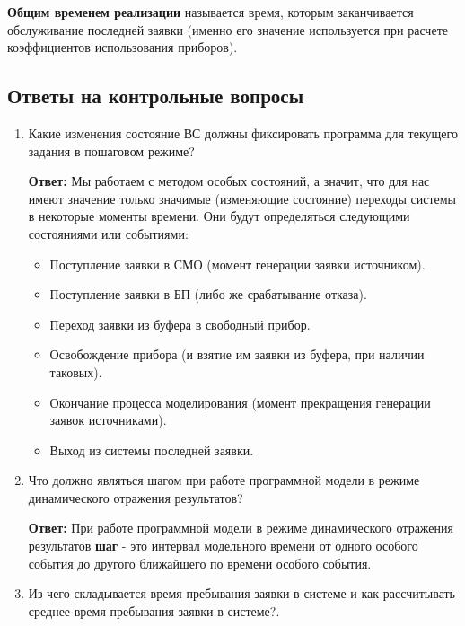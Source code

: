 \documentclass[a4paper, 14pt]{article}
\begin{document}
\textbf{Общим временем реализации} называется время, которым заканчивается обслуживание последней заявки (именно его значение используется при расчете коэффициентов использования приборов).
\subsection{Ответы на контрольные вопросы}

\begin{enumerate}
	\item Какие изменения состояние ВС должны фиксировать программа для текущего задания в пошаговом режиме?

	      \textbf{Ответ:} Мы работаем с методом особых состояний, а значит, что для нас имеют значение только значимые (изменяющие состояние) переходы системы в некоторые моменты времени. Они будут определяться следующими состояниями или событиями:
	      \begin{itemize}
		      \item Поступление заявки в СМО (момент генерации заявки источником).
		      \item Поступление заявки в БП (либо же срабатывание отказа).
		      \item Переход заявки из буфера в свободный прибор.
		      \item Освобождение прибора (и взятие им заявки из буфера, при наличии таковых).
		      \item Окончание процесса моделирования (момент прекращения генерации заявок источниками).
		      \item Выход из системы последней заявки.
	      \end{itemize}
	\item Что должно являться шагом при работе программной модели в режиме динамического отражения результатов?

	      \textbf{Ответ:} При работе программной модели в режиме динамического отражения результатов \textbf{шаг} - это интервал модельного времени от одного особого события до другого ближайшего по времени особого события.
	\item Из чего складывается время пребывания заявки в системе и как рассчитывать среднее время пребывания заявки в системе?.


\end{enumerate}
\end{document}
